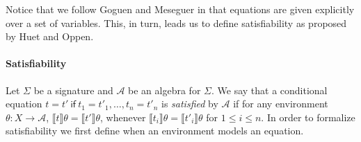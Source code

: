 \noindent Notice that we follow Goguen and Meseguer in that equations
are given explicitly over a set of variables. This, in turn, leads us
to define satisfiability as proposed by Huet and Oppen.

\paragraph*{Satisfiability} Let $\Sigma$ be a signature and
$\mathcal{A}$ be an algebra for $\Sigma$. We say that a conditional equation
$t = t'\ \mathsf{if}\ t_1 = t'_1,\ldots,t_n=t'_n$ is
\emph{satisfied} by $\mathcal{A}$ if for any
environment $\theta : X \to \mathcal{A}$, $⟦ t ⟧θ = ⟦ t' ⟧θ$, whenever
$⟦ t_i ⟧θ = ⟦ t'_i ⟧θ$ for $1 \leqslant i \leqslant n$. In order to
formalize satisfiability we first define when an environment models an
equation.

\begin{code}
  \>[0]\AgdaSpace{}%
\AgdaSymbol{:}\AgdaSpace{}%
%
\>[12]\AgdaSymbol{\{}\AgdaSpace{}%
\AgdaSymbol{:}\AgdaSpace{}%
\AgdaSpace{}%
\AgdaSymbol{\}}\AgdaSpace{}%
\AgdaSymbol{(}\AgdaSpace{}%
\AgdaSymbol{:}\AgdaSpace{}%
\AgdaSpace{}%
\AgdaSymbol{)}\AgdaSpace{}%
\AgdaSpace{}%
\AgdaSymbol{(}\AgdaSpace{}%
\AgdaSymbol{:}\AgdaSpace{}%
\AgdaSpace{}%
\AgdaSpace{}%
\AgdaSpace{}%
\AgdaSymbol{)}\AgdaSpace{}%
\AgdaSpace{}%
\AgdaSymbol{\{}\AgdaSpace{}%
\AgdaSymbol{:}\AgdaSpace{}%
\AgdaSpace{}%
\AgdaSymbol{\}}\AgdaSpace{}%
\AgdaSpace{}%
\AgdaSpace{}%
\AgdaSpace{}%
\AgdaSpace{}%
\AgdaSpace{}%
\<%
\\
\>[0]\AgdaSpace{}%
\AgdaSymbol{\{}\AgdaSymbol{\}}\AgdaSpace{}%
\AgdaSpace{}%
\AgdaSpace{}%
\AgdaSymbol{\{}\AgdaSymbol{\}}\AgdaSpace{}%
\AgdaSymbol{(}\AgdaSpace{}%
\AgdaSpace{}%
\AgdaSymbol{)}\AgdaSpace{}%
\AgdaSymbol{=}\AgdaSpace{}%
\AgdaSpace{}%
\AgdaSpace{}%
\AgdaSpace{}%
\AgdaSpace{}%
\AgdaSpace{}%
\AgdaSpace{}%
\<%
\end{code}

